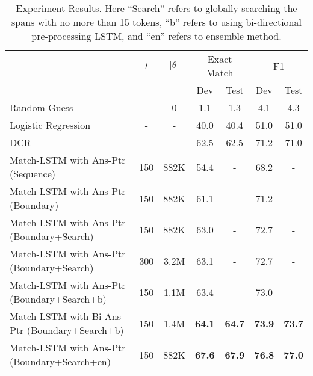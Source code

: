 \documentclass{article} \usepackage{iclr2017_conference,times}
\begin{document}
\begin{table}[]
\centering
	 \small
	
\begin{tabular}{lcccccc}
		\toprule
		\multicolumn{1}{c}{}      & \multicolumn{1}{c}{$l$} & \multicolumn{1}{c}{$|\theta|$} & \multicolumn{2}{c}{Exact Match}   & \multicolumn{2}{c}{F1}            \\ 
		&                       &                         & Dev             & Test            & Dev             & Test            \\ \midrule
		Random Guess              & -                     & 0                       & 1.1          & 1.3           & 4.1           & 4.3           \\
		Logistic Regression       & -                     & -                       & 40.0          & 40.4          & 51.0          & 51.0          \\
		DCR       & -                     & -                       &  62.5           & 62.5           & 71.2           & 71.0          \\ \midrule 
		Match-LSTM with Ans-Ptr (Sequence) & 150                   & 882K                    & 54.4 & - & 68.2 & - \\
		Match-LSTM with Ans-Ptr (Boundary) & 150                   & 882K                    & 61.1 & - & 71.2 & - \\
		Match-LSTM with Ans-Ptr (Boundary+Search) & 150                   & 882K                    & 63.0 & - & 72.7 & - \\
		Match-LSTM with Ans-Ptr (Boundary+Search) & 300                   & 3.2M                    & 63.1 & - & 72.7 & - \\
		Match-LSTM with Ans-Ptr (Boundary+Search+b) & 150                   & 1.1M                    & 63.4 & - & 73.0 & - \\
		Match-LSTM with Bi-Ans-Ptr (Boundary+Search+b) & 150                   & 1.4M                    & \textbf{64.1} & \textbf{64.7} & \textbf{73.9} & \textbf{73.7} \\ \midrule
		Match-LSTM with Ans-Ptr (Boundary+Search+en) & 150                   & 882K                    & \textbf{67.6} & \textbf{67.9} & \textbf{76.8} & \textbf{77.0} \\
		 \bottomrule
\end{tabular}
\normalsize
\caption{Experiment Results. Here ``Search'' refers to globally searching the spans with no more than 15 tokens, ``b'' refers to using bi-directional pre-processing LSTM, and ``en'' refers to ensemble method.}
\label{tab:results}
\end{table}
\end{document}
